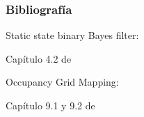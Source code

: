 \begin{frame}
	\frametitle{Bibliografía}
   
    Static state binary Bayes filter:
    
    Capítulo 4.2 de \cite{thrun2005probabilistic}
    
    Occupancy Grid Mapping:
    
    Capítulo 9.1 y 9.2 de \cite{thrun2005probabilistic}
	
	\printbibliography
	
\end{frame}